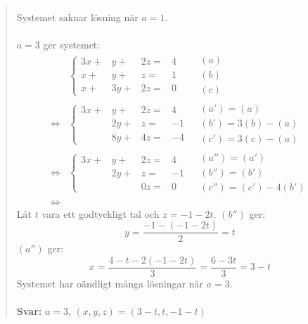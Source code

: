\documentclass[a4paper]{article}
\begin{document}
\begin{quotation}
\begin{align*}
	\end{align*}
	Systemet saknar lösning när $a=1$.
	\\ \\
	$a=3$ ger systemet:
	\begin{align*}
	&\left\{\begin{array}{rrrr}
	3x+& y+&2z=&4 \\
	 x+& y+& z=&1 \\
	 x+&3y+&2z=&0
	\end{array} \right.
	&\begin{array}{l} 
	(a) \\ 
	(b) \\
	(c)
	\end{array} \\ \Leftrightarrow
	&\left\{\begin{array}{rrrr}
	3x+& y+&2z=&4 \\
	   &2y+& z=&-1 \\
	   &8y+&4z=&-4
	\end{array} \right.
	&\begin{array}{l} 
	(a')=(a) \\ 
	(b')=3(b)-(a) \\
	(c')=3(c)-(a)
	\end{array} \\ \Leftrightarrow
	&\left\{\begin{array}{rrrr}
	3x+& y+&2z=&4 \\
	   &2y+& z=&-1 \\
	   &   &0z=&0
	\end{array} \right.
	&\begin{array}{l} 
	(a'')=(a') \\ 
	(b'')=(b') \\
	(c'')=(c')-4(b')
	\end{array} \\ \Leftrightarrow
	\end{align*}
	Låt $t$ vara ett godtyckligt tal och $z=-1-2t$.
	$(b'')$ ger:
	\[y=\frac{-1-(-1-2t)}{2}=t\]
	$(a'')$ ger:
	\[x=\frac{4-t-2(-1-2t)}{3}=\frac{6-3t}{3}=3-t\]
	Systemet har oändligt många lösningar när $a=3$.
	\\ \\
	\textbf{Svar:} $a=3$, $(x,y,z)=(3-t,t,-1-t)$
\end{quotation}
\end{document}
